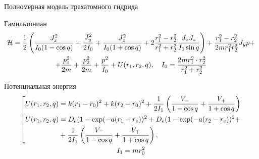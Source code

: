 \documentclass[hyperref={pdfpagelabels=false},usepdftitle=false, xcolor = dvipsnames]{beamer}
\begin{document}
\begin{frame}{Полномерная модель трехатомного гидрида}
\begin{block}{Гамильтониан}
\scriptsize \begin{gather}
\mathcal{H} = \frac{1}{2} \left( \frac{J_x^2}{I_0 (1 - \cos q)} + \frac{J_y^2}{2 I_0} + \frac{J_z^2}{I_0 (1 + \cos q)} + 2 \frac{r_1^2 - r_2^2}{r_1^2 + r_2^2} \frac{J_x J_z}{I_0 \sin q} \right) + \frac{r_1^2 - r_2^2}{2m r_1^2 r_2^2} J_y p + \notag \\
+ \frac{p_1^2}{2m} + \frac{p_2^2}{2m} + \frac{p^2}{I_0} + U (r_1, r_2, q),
\quad I_0 = \frac{2m r_1^2 \cdot r_2^2}{r_1^2 + r_2^2} \notag
\end{gather}
\end{block}
\begin{block}{Потенциальная энергия}
\scriptsize \begin{gather}
\left[
\begin{aligned}
U(r_1, r_2, q) &= k (r_1 - r_0)^2 + k (r_2 - r_0)^2 + \frac{1}{2 I_1} \left( \frac{V_{-}}{1 - \cos q} + \frac{V_{+}}{1 + \cos q} \right) \\
U(r_1, r_2, q) &= D_e (1 - \exp (- a (r_1 - r_e))^2 + D_e (1 - \exp (- a (r_2 - r_e))^2 + \\
&+ \frac{1}{2 I_1} \left( \frac{V_{-}}{1 - \cos q} + \frac{V_{+}}{1 + \cos q} \right) ,
\end{aligned}
\right. \notag \\
I_1 = m r_0^2 \notag
\end{gather}
\end{block}
\end{frame}
\end{document}
